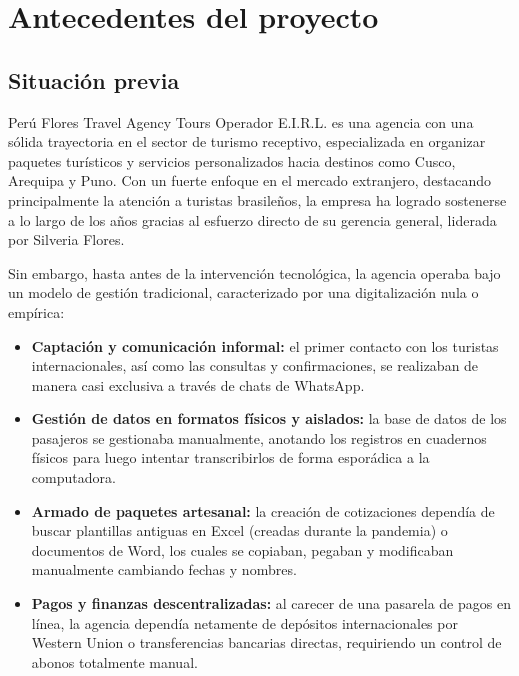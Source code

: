 \section{Antecedentes del proyecto}

\subsection{Situación previa}
\begin{indentedsubsection}
Perú Flores Travel Agency Tours Operador E.I.R.L. es una agencia con una sólida trayectoria en el sector de turismo receptivo, especializada en organizar paquetes turísticos y servicios personalizados hacia destinos como Cusco, Arequipa y Puno. Con un fuerte enfoque en el mercado extranjero, destacando principalmente la atención a turistas brasileños, la empresa ha logrado sostenerse a lo largo de los años gracias al esfuerzo directo de su gerencia general, liderada por Silveria Flores.

Sin embargo, hasta antes de la intervención tecnológica, la agencia operaba bajo un modelo de gestión tradicional, caracterizado por una digitalización nula o empírica:

\begin{itemize}
    \item \textbf{Captación y comunicación informal:} el primer contacto con los turistas internacionales, así como las consultas y confirmaciones, se realizaban de manera casi exclusiva a través de chats de WhatsApp.
    \item \textbf{Gestión de datos en formatos físicos y aislados:} la base de datos de los pasajeros se gestionaba manualmente, anotando los registros en cuadernos físicos para luego intentar transcribirlos de forma esporádica a la computadora.
    \item \textbf{Armado de paquetes artesanal:} la creación de cotizaciones dependía de buscar plantillas antiguas en Excel (creadas durante la pandemia) o documentos de Word, los cuales se copiaban, pegaban y modificaban manualmente cambiando fechas y nombres.
    \item \textbf{Pagos y finanzas descentralizadas:} al carecer de una pasarela de pagos en línea, la agencia dependía netamente de depósitos internacionales por Western Union o transferencias bancarias directas, requiriendo un control de abonos totalmente manual.
\end{itemize}
\end{indentedsubsection}

